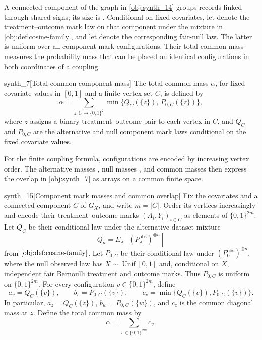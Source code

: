A connected component  of the graph in \cref{obj:synth_14} groups records linked through shared signs; its size is . Conditional on fixed covariates, let  denote the treatment--outcome mark law on that component under the mixture in \cref{obj:def:cosine-family}, and let  denote the corresponding fair-null law. The latter is uniform over all component mark configurations. Their total common mass  measures the probability mass that can be placed on identical configurations in both coordinates of a coupling.

\begin{definitionv}{synth_7}[Total common component mass]
The total common mass \(\alpha\), for fixed covariate values in \([0,1]\) and a finite vertex set \(C\), is defined by
\[
\alpha
=
\sum_{z:C\to\{0,1\}^2}
\min\bigl\{Q_C(\{z\}),\,P_{0,C}(\{z\})\bigr\},
\]
where \(z\) assigns a binary treatment–outcome pair to each vertex in \(C\), and \(Q_C\) and \(P_{0,C}\) are the alternative and null component mark laws conditional on the fixed covariate values.
\end{definitionv}

For the finite coupling formula, configurations are encoded by increasing vertex order. The alternative masses , null masses , and common masses  then express the overlap in \cref{obj:synth_7} as arrays on a common finite space.

\begin{definitionv}{synth_15}[Component mark masses and common overlap]
Fix the covariates and a connected component \(C\) of \(G_X\), and write \(m=|C|\). Order its vertices increasingly and encode their treatment–outcome marks \((A_i,Y_i)_{i\in C}\) as elements of \(\{0,1\}^{2m}\). Let \(Q_C\) be their conditional law under the alternative dataset mixture
\[
Q_n=E_\lambda[(P_\lambda^{\mathrm{obs}})^{\otimes n}]
\]
from \(\cref{obj:def:cosine-family}\). Let \(P_{0,C}\) be their conditional law under \((P_0^{\mathrm{obs}})^{\otimes n}\), where the null observed law has \(X\sim\operatorname{Unif}[0,1]\) and, conditional on \(X\), independent fair Bernoulli treatment and outcome marks. Thus \(P_{0,C}\) is uniform on \(\{0,1\}^{2m}\). For every configuration \(v\in\{0,1\}^{2m}\), define
\[
a_v=Q_C(\{v\}),\qquad
b_v=P_{0,C}(\{v\}),\qquad
c_v=\min\{Q_C(\{v\}),P_{0,C}(\{v\})\}.
\]
In particular, \(a_z=Q_C(\{z\})\), \(b_w=P_{0,C}(\{w\})\), and \(c_z\) is the common diagonal mass at \(z\). Define the total common mass by
\[
\alpha=\sum_{v\in\{0,1\}^{2m}}c_v.
\]
\end{definitionv}

